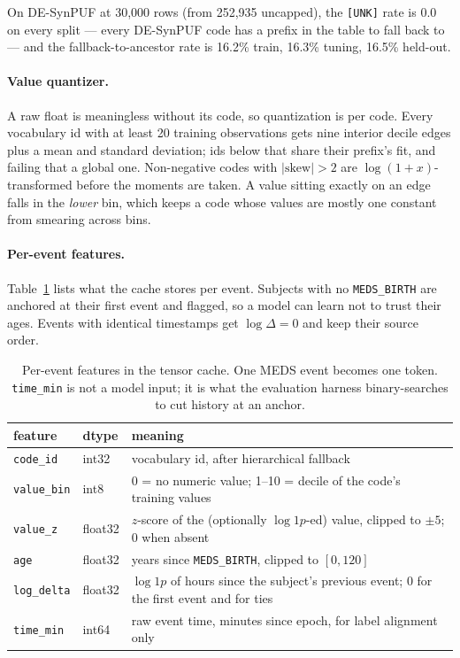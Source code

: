 \documentclass[11pt,a4paper]{article}
\newcommand{\code}[1]{\texttt{\small #1}}
\begin{document}
On DE-SynPUF at 30{,}000 rows (from 252{,}935 uncapped), the \code{[UNK]} rate
is 0.0 on every split --- every DE-SynPUF code has a prefix in the table to fall
back to --- and the fallback-to-ancestor rate is 16.2\% train, 16.3\% tuning,
16.5\% held-out.

\paragraph{Value quantizer.}
A raw float is meaningless without its code, so quantization is per code. Every
vocabulary id with at least 20 training observations gets nine interior decile
edges plus a mean and standard deviation; ids below that share their prefix's
fit, and failing that a global one. Non-negative codes with $|\text{skew}| > 2$
are $\log(1+x)$-transformed before the moments are taken. A value sitting
exactly on an edge falls in the \emph{lower} bin, which keeps a code whose
values are mostly one constant from smearing across bins.

\paragraph{Per-event features.}
Table~\ref{tab:features} lists what the cache stores per event. Subjects with no
\code{MEDS\_BIRTH} are anchored at their first event and flagged, so a model can
learn not to trust their ages. Events with identical timestamps get
$\log\Delta = 0$ and keep their source order.

\begin{table}[t]
\centering\small
\caption{Per-event features in the tensor cache. One MEDS event becomes one
token. \code{time\_min} is not a model input; it is what the evaluation harness
binary-searches to cut history at an anchor.}
\label{tab:features}
\begin{tabular}{llp{}}
\toprule
feature & dtype & meaning \\
\midrule
\code{code\_id}   & int32   & vocabulary id, after hierarchical fallback \\
\code{value\_bin} & int8    & 0 = no numeric value; 1--10 = decile of the code's training values \\
\code{value\_z}   & float32 & $z$-score of the (optionally $\log 1p$-ed) value, clipped to $\pm 5$; 0 when absent \\
\code{age}        & float32 & years since \code{MEDS\_BIRTH}, clipped to $[0, 120]$ \\
\code{log\_delta} & float32 & $\log 1p$ of hours since the subject's previous event; 0 for the first event and for ties \\
\code{time\_min}  & int64   & raw event time, minutes since epoch, for label alignment only \\
\bottomrule
\end{tabular}
\end{table}
\end{document}
